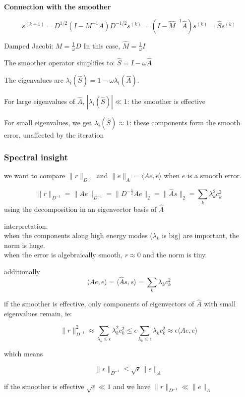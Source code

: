 \documentclass{article}
\begin{document}
\textbf{Connection with the smoother}

\[
s^{(k+1)} = D^{1/2}\left(I - M^{-1}A\right)D^{-1/2}s^{(k)} = \left(I - \hat{M}^{-1}\hat{A}\right)s^{(k)} = \hat{S}s^{(k)}
\]

Damped Jacobi: $M = \frac{1}{\omega}D$
In this case, $\hat{M} = \frac{1}{\omega}I$

The smoother operator simplifies to: $\hat{S} = I - \omega \hat{A}$

The eigenvalues are $\lambda_i(\hat{S}) = 1 - \omega \lambda_i(\hat{A})$.

For large eigenvalues of $\hat{A}$, $|\lambda_i(\hat{S})| \ll 1$: the smoother is effective

For small eigenvalues, we get $\lambda_i(\hat{S}) \approx 1$: these components form the smooth error, unaffected by the iteration

\subsubsection*{Spectral insight}
we want to compare $\|r\|_{D^{-1}} $ and $\|e\|_{A} = \langle Ae,e \rangle$ when $e$ is a smooth error.

\[
\|r\|_{D^{-1}} = \|Ae\|_{D^{-1}} = \|D^{-\frac{1}{2}}Ae\|_{2} = \|\hat{A}s\|_{2} = \sum_{k}{\lambda_{k}^2c_{k}^{2}}
\]
using the decomposition in an eigenvector basis of $\hat{A}$

interpretation: \\
when the components along high energy modes ($\lambda_{k}$ is big) are important, the norm is huge. \\
when the error is algebraically smooth, $r \approx 0$ and the norm is tiny. 

additionally
\[
\langle Ae,e \rangle = \langle \hat{A}s,s \rangle = \sum_{k}{\lambda_{k}c_{k}^{2}}
\]


if the smoother is effective, only components of eigenvectors of $\hat{A}$ with small eigenvalues remain, ie:

\[
\|r\|_{D^{-1}}^{2} \approx \sum_{\lambda_{k} \le \epsilon}{\lambda_{k}^{2}c_{k}^{2}} \le \epsilon \sum_{\lambda_{k} \le \epsilon}{\lambda_{k}c_{k}^{2}} \approx \epsilon \langle Ae,e \rangle
\]

which means

\[
\|r\|_{D^{-1}} \le \sqrt{\epsilon}\|e\|_{A}
\]

if the smoother is effective $\sqrt{\epsilon} \ll 1$ and we have $\|r\|_{D^{-1}} \ll  \|e\|_{A}$
\end{document}
